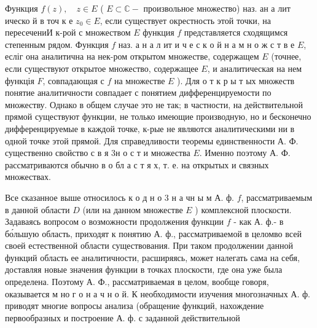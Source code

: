 \documentclass[10pt]{article}
\begin{document}
Функция $f(z), \quad z \in E$ ( $E \subset \mathbb{C}-$ произвольное множество) наз. ан а лит ическо й в точ к е $z_{0} \in E$, если существует окрестность этой точки, на пересечениИ к-рой с множеством $E$ функция $f$ представляется сходящимся степенным рядом. Функция $f$ наз. а н а л ит и ч е с к о й н а м н о ж с т в е $E$, есліг она аналитична на нек-ром открытом множестве, содержащем $E$ (точнее, если существуют открытое множество, содержащее $E$, и аналитическая на нем функція $F$, совпадающая с $f$ на множестве $E$ ). Для о т к р ы т ых множеств понятие аналитичности совпадает с понятием дифференцируемости по множеству. Однако в общем случае это не так; в частности, на действительной прямой существуют функции, не только имеющие производную, но и бесконечно дифференцируемые в каждой точке, к-рые не являются аналитическими ни в одной точке этой прямой. Для справедливости теоремы единственности А. Ф. существенно свойство с в я 3н о с т и множества $E$. Именно поэтому А. Ф. рассматриваются обычно в о бл а с т я х, т. е. на открытых и связных множествах.



Все сказанное выше относилось к о д н о 3 н а чн ы м А. ф. $f$, рассматриваемым в данной области $D$ (или на данном множестве $E$ ) комплексной плоскости. Задаваясь вопросом о возможности продолжения функции $f$ - как А. ф.- в бо́льшую область, приходят к понятию А. ф., рассматриваемой в целомво всей своей естественной области существования. При таком продолжении данной функций область ее аналитичности, расширяясь, может налегать сама на себя, доставляя новые значения функции в точках плоскости, где она уже была определена. Поэтому А. Ф., рассматриваемая в целом, вообще говоря, оказывается м но г о $\mathbf{н}$ а ч н о й. К необходимости изучения многозначных А. ф. приводят многие вопросы анализа (обращение функций, нахождение первообразных и построение А. ф. с заданной действительной
\end{document}
